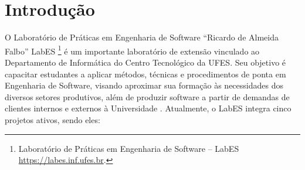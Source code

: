 \chapter{Introdução}
\label{sec-intro}
O Laboratório de Práticas em Engenharia de Software “Ricardo de Almeida Falbo” LabES \footnote{Laboratório de Práticas em Engenharia de Software – LabES \url{https://labes.inf.ufes.br}.}
 é um importante laboratório de extensão vinculado ao  Departamento de Informática do Centro Tecnológico da UFES. Seu objetivo é capacitar estudantes a aplicar métodos, técnicas e procedimentos de ponta em Engenharia de Software, visando aproximar sua formação às necessidades dos diversos setores produtivos, além de produzir software a partir de demandas de clientes internos e externos à Universidade \cite{LabES}. Atualmente, o LabES integra cinco projetos ativos, sendo eles:
